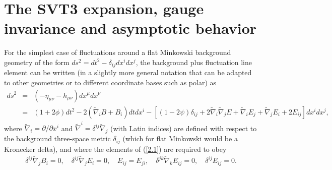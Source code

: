 \documentclass[aps,onecolumn,10pt]{revtex4}
\numberwithin{equation}{section}
\numberwithin{equation}{section}
\begin{document}
\section{The SVT3 expansion, gauge invariance and asymptotic behavior}
\label{S2}

For the simplest case of fluctuations around a flat Minkowski background geometry of the form $ds^2=dt^2-\delta_{ij}dx^idx^j$, the background plus fluctuation line element can be written (in a slightly more general notation that can be adapted to other geometries or to different coordinate bases such as polar) as 
%
\begin{eqnarray}
ds^2 &=&(-\eta_{\mu\nu}-h_{\mu\nu})dx^{\mu}dx^{\nu}
\nonumber\\
&=&(1+2\phi) dt^2 -2(\tilde{\nabla}_i B +B_i)dt dx^i - [(1-2\psi)\delta_{ij} +2\tilde{\nabla}_i\tilde{\nabla}_j E + \tilde{\nabla}_i E_j + \tilde{\nabla}_j E_i + 2E_{ij}]dx^i dx^j,
\label{2.1}
\end{eqnarray}
%
where $\tilde{\nabla}_i=\partial/\partial x^i$ and  $\tilde{\nabla}^i=\delta^{ij}\tilde{\nabla}_j$  (with Latin indices) are defined with respect to the background three-space metric $\delta_{ij}$ (which for flat Minkowski would be a Kronecker delta), and where the elements of (\ref{2.1}) are required to obey
%
\begin{eqnarray}
\delta^{ij}\tilde{\nabla}_j B_i = 0,\quad \delta^{ij}\tilde{\nabla}_j E_i = 0, \quad E_{ij}=E_{ji},\quad \delta^{jk}\tilde{\nabla}_kE_{ij} = 0, \quad \delta^{ij}E_{ij} = 0.
\label{2.2}
\end{eqnarray}
%
\end{document}
